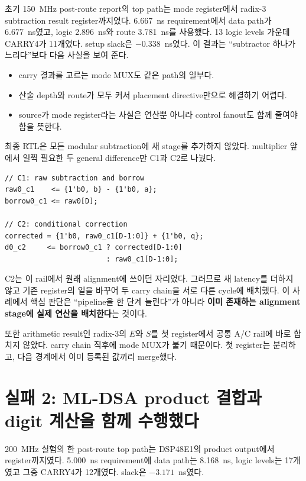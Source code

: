 초기 150~MHz post-route report의 top path는 mode register에서
radix-3 subtraction result register까지였다. 6.667~ns requirement에서 data
path가 6.677~ns였고, logic 2.896~ns와 route 3.781~ns를 사용했다. 13 logic
levels 가운데 CARRY4가 11개였다. setup slack은 $-0.338$~ns였다. 이 결과는
“subtractor 하나가 느리다”보다 다음 사실을 보여 준다.

\begin{itemize}
  \item carry 결과를 고르는 mode MUX도 같은 path의 일부다.
  \item 산술 depth와 route가 모두 커서 placement directive만으로 해결하기 어렵다.
  \item source가 mode register라는 사실은 연산뿐 아니라 control fanout도
        함께 줄여야 함을 뜻한다.
\end{itemize}

최종 RTL은 모든 modular subtraction에 새 stage를 추가하지 않았다. multiplier
앞에서 일찍 필요한 두 general difference만 C1과 C2로 나눴다.

\begin{lstlisting}
// C1: raw subtraction and borrow
raw0_c1    <= {1'b0, b} - {1'b0, a};
borrow0_c1 <= raw0[D];

// C2: conditional correction
corrected = {1'b0, raw0_c1[D-1:0]} + {1'b0, q};
d0_c2     <= borrow0_c1 ? corrected[D-1:0]
                        : raw0_c1[D-1:0];
\end{lstlisting}

C2는 이 rail에서 원래 alignment에 쓰이던 자리였다. 그러므로 새 latency를
더하지 않고 기존 register의 일을 바꾸어 두 carry chain을 서로 다른 cycle에
배치했다. 이 사례에서 핵심 판단은 “pipeline을 한 단계 늘린다”가 아니라
\textbf{이미 존재하는 alignment stage에 실제 연산을 배치한다}는 것이다.

또한 arithmetic result인 radix-3의 $E$와 $S$를 첫 register에서 공통 A/C rail에
바로 합치지 않았다. carry chain 직후에 mode MUX가 붙기 때문이다. 첫 register는
분리하고, 다음 경계에서 이미 등록된 값끼리 merge했다.

\section{실패 2: ML-DSA product 결합과 digit 계산을 함께 수행했다}

200~MHz 실험의 한 post-route top path는 DSP48E1의 product output에서
 register까지였다. 5.000~ns requirement에 data path는
8.168~ns, logic levels는 17개였고 그중 CARRY4가 12개였다. slack은
$-3.171$~ns였다.

